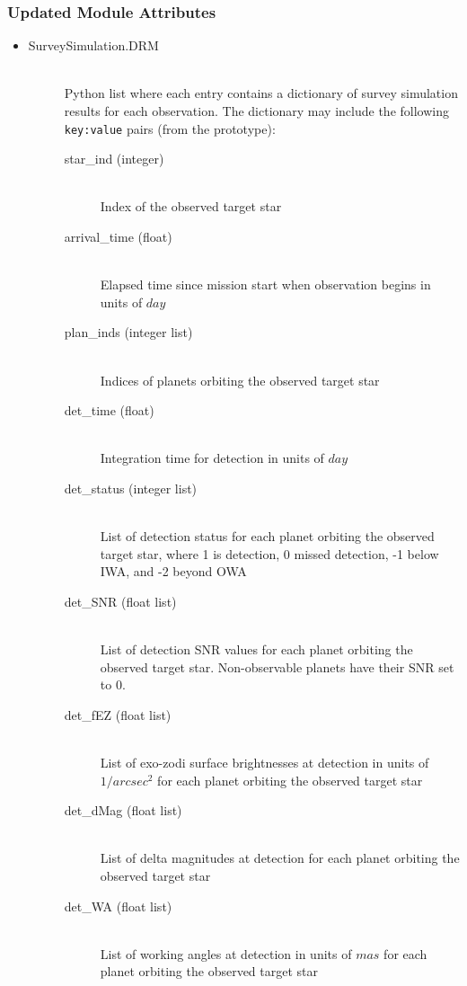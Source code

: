 \documentclass[cleanfoot]{asme2ej}
\begin{document}
\subsubsection*{Updated Module Attributes}
\begin{itemize}
\item 
\begin{description}
    \item[SurveySimulation.DRM] \hfill \\ Python list where each entry contains a dictionary of survey simulation results for each observation.  The dictionary may include the following \verb+key:value+ pairs (from the prototype):
    \begin{description}
        \item[star\_ind (integer)] \hfill \\ Index of the observed target star
        \item[arrival\_time (float)] \hfill \\ Elapsed time since mission start when observation begins in units of $day$
        \item[plan\_inds (integer list)] \hfill \\ Indices of planets orbiting the observed target star
        \item[det\_time (float)] \hfill \\ Integration time for detection in units of $ day $
        \item[det\_status (integer list)] \hfill \\ List of detection status for each planet orbiting the observed target star, where 1 is detection, 0 missed detection, -1 below IWA, and -2 beyond OWA
        \item[det\_SNR (float list)] \hfill \\ List of detection SNR values for each planet orbiting the observed target star. Non-observable planets have their SNR set to 0.
        \item[det\_fEZ (float list)] \hfill \\ List of exo-zodi surface brightnesses at detection in units of $1/arcsec^2$ for each planet orbiting the observed target star
        \item[det\_dMag (float list)] \hfill \\ List of delta magnitudes  at detection for each planet orbiting the observed target star
        \item[det\_WA (float list)] \hfill \\ List of working angles  at detection in units of $mas$ for each planet orbiting the observed target star

\end{description}
\end{description}
\end{itemize}
\end{document}
